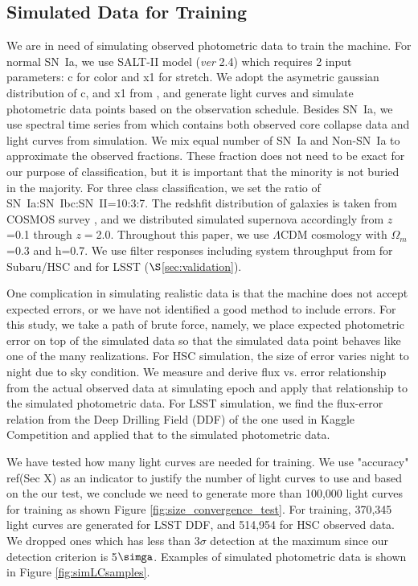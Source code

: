 \documentclass[useamsfonts]{pasj01}
\begin{document}
\subsection{Simulated Data for Training}
\label{sec:training}
We are in need of simulating observed photometric data to train the machine.  
For normal SN~Ia, we use SALT-II \citep{guy10a} model ({\it ver} 2.4) which requires 2 input parameters:
c for color and x1 for stretch.
We adopt the asymetric gaussian distribution of c, and x1 from \citet{mosher14a}, and generate
light curves and simulate photometric data points based on the observation schedule. 
Besides SN~Ia, we use spectral time series from \citet{kessler19b} which contains both observed
core collapse data and light curves from simulation.
We mix equal number of SN~Ia and Non-SN~Ia to approximate the observed fractions. 
These fraction does not need to be exact for our purpose of classification, but it is important
that the minority is not buried in the majority.
For three class classification, we set the ratio of SN~Ia:SN~Ibc:SN~II=10:3:7.
The redshfit distribution of galaxies is taken from COSMOS survey \citep{laigle16a}, and we distributed
simulated supernova accordingly from $z$=0.1 through $z=$2.0.
Throughout this paper, we use $\Lambda$CDM cosmology with $\Omega_{m}$=0.3 and h=0.7.
We use filter responses including system throughput from \citet{kawanomoto18a} for Subaru/HSC and
\citet{ivezic19a} for LSST ($\S$\ref{sec:validation}). 

One complication in simulating realistic data is that the machine does not accept expected errors,
or we have not identified a good method to include errors.   
For this study, we take a path of brute force, namely, we place expected photometric error on top 
of the simulated data so that the simulated data point behaves like one of the many realizations.
For HSC simulation, the size of error varies night to night due to sky condition. 
We measure and derive flux vs. error relationship from the actual observed data at simulating epoch 
and apply that relationship to the simulated photometric data.
For LSST simulation, we find the flux-error relation from the Deep Drilling Field (DDF) of the one
used in Kaggle Competition \citep{malz19a} and applied that to the simulated photometric data.

We have tested how many light curves are needed for training.  We use "accuracy" ref(Sec X) as an 
indicator to justify the number of light curves to use and based on the our test, we conclude we need 
to generate more than 100,000 light curves for training as shown Figure \ref{fig:size_convergence_test}.
For training, 370,345 light curves are generated for LSST DDF, and 514,954 for HSC observed data.
We dropped ones which has less than 3$\sigma$ detection at the maximum since our detection criterion
is 5$\simga$.  %
Examples of simulated photometric data is shown in Figure \ref{fig:simLCsamples}.
\end{document}
